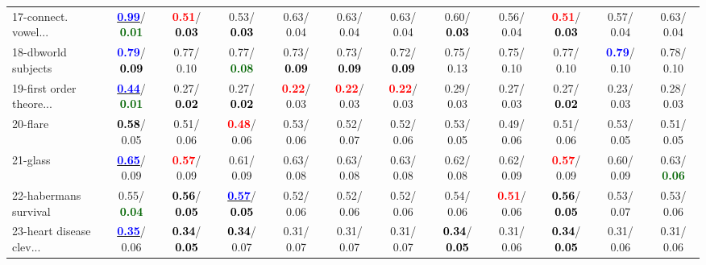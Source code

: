 \begin{table}[h]
\begin{center}
{\begin{tabular}{lc|c|c|c|c|c|c|c|c|c|c}
17-connect. vowel... & \underline{\textcolor{blue}{\textbf{  0.99}}}/\textcolor{darkgreen}{\textbf{  0.01}} & \textcolor{red}{\textbf{  0.51}}/\textcolor{black}{\textbf{  0.03}} &   0.53/\textcolor{black}{\textbf{  0.03}} &   0.63/  0.04 &   0.63/  0.04 &   0.63/  0.04 &   0.60/\textcolor{black}{\textbf{  0.03}} &   0.56/  0.04 & \textcolor{red}{\textbf{  0.51}}/\textcolor{black}{\textbf{  0.03}} &   0.57/  0.04 &   0.63/  0.04 \\
18-dbworld subjects & \textcolor{blue}{\textbf{  0.79}}/\textcolor{black}{\textbf{  0.09}} &   0.77/  0.10 &   0.77/\textcolor{darkgreen}{\textbf{  0.08}} &   0.73/\textcolor{black}{\textbf{  0.09}} &   0.73/\textcolor{black}{\textbf{  0.09}} &   0.72/\textcolor{black}{\textbf{  0.09}} &   0.75/  0.13 &   0.75/  0.10 &   0.77/  0.10 & \textcolor{blue}{\textbf{  0.79}}/  0.10 &   0.78/  0.10 \\
19-first order theore... & \underline{\textcolor{blue}{\textbf{  0.44}}}/\textcolor{darkgreen}{\textbf{  0.01}} &   0.27/\textcolor{black}{\textbf{  0.02}} &   0.27/\textcolor{black}{\textbf{  0.02}} & \textcolor{red}{\textbf{  0.22}}/  0.03 & \textcolor{red}{\textbf{  0.22}}/  0.03 & \textcolor{red}{\textbf{  0.22}}/  0.03 &   0.29/  0.03 &   0.27/  0.03 &   0.27/\textcolor{black}{\textbf{  0.02}} &   0.23/  0.03 &   0.28/  0.03 \\
20-flare & \textcolor{black}{\textbf{  0.58}}/  0.05 &   0.51/  0.06 & \textcolor{red}{\textbf{  0.48}}/  0.06 &   0.53/  0.06 &   0.52/  0.07 &   0.52/  0.06 &   0.53/  0.05 &   0.49/  0.06 &   0.51/  0.06 &   0.53/  0.05 &   0.51/  0.05 \\
21-glass & \underline{\textcolor{blue}{\textbf{  0.65}}}/  0.09 & \textcolor{red}{\textbf{  0.57}}/  0.09 &   0.61/  0.09 &   0.63/  0.08 &   0.63/  0.08 &   0.63/  0.08 &   0.62/  0.08 &   0.62/  0.09 & \textcolor{red}{\textbf{  0.57}}/  0.09 &   0.60/  0.09 &   0.63/\textcolor{darkgreen}{\textbf{  0.06}} \\ \hline
22-habermans survival &   0.55/\textcolor{darkgreen}{\textbf{  0.04}} & \textcolor{black}{\textbf{  0.56}}/\textcolor{black}{\textbf{  0.05}} & \underline{\textcolor{blue}{\textbf{  0.57}}}/\textcolor{black}{\textbf{  0.05}} &   0.52/  0.06 &   0.52/  0.06 &   0.52/  0.06 &   0.54/  0.06 & \textcolor{red}{\textbf{  0.51}}/  0.06 & \textcolor{black}{\textbf{  0.56}}/\textcolor{black}{\textbf{  0.05}} &   0.53/  0.07 &   0.53/  0.06 \\
23-heart disease clev... & \underline{\textcolor{blue}{\textbf{  0.35}}}/  0.06 & \textcolor{black}{\textbf{  0.34}}/\textcolor{black}{\textbf{  0.05}} & \textcolor{black}{\textbf{  0.34}}/  0.07 &   0.31/  0.07 &   0.31/  0.07 &   0.31/  0.07 & \textcolor{black}{\textbf{  0.34}}/\textcolor{black}{\textbf{  0.05}} &   0.31/  0.06 & \textcolor{black}{\textbf{  0.34}}/\textcolor{black}{\textbf{  0.05}} &   0.31/  0.06 &   0.31/  0.06 \\

\end{tabular}}
\end{center}
\end{table}
